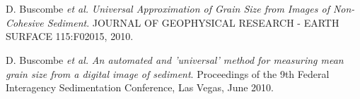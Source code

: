 \documentclass{article} %
\def\sf{\sffamily}
\def\sl{\slshape}
\newlength\sidebarwidth
\newcommand{\subtopic}[3][]
	 {\begin{minipage}{\textwidth}
	 \vspace*{.4\baselineskip}
         \nopagebreak\hspace{0in}%
         \nopagebreak\begin{minipage}[t]{\sidebarwidth - .2cm}
         \raggedleft {\sf\fontseries{sbc}\selectfont #2}
         {\\[-0.2\baselineskip] \textcolor{gray}{\footnotesize #1}}
	 \end{minipage}%
	 \hfill
	 \begin{minipage}[t]{\linewidth - \sidebarwidth}
	 #3%
	 \end{minipage}%
	 \vspace*{.2\baselineskip plus 1\baselineskip minus
	 .2\baselineskip}%
	 \end{minipage}}
\begin{document}
\subtopic{\hspace*{-3ex} 2010}{~
  \begin{itemize}[leftmargin=0ex, itemsep=0ex, parsep=.5ex, labelindent=-4ex]

    \publication
      D. Buscombe {\sl et al.}
      {\sl Universal Approximation of Grain Size from Images of Non-Cohesive Sediment}.
      JOURNAL OF GEOPHYSICAL RESEARCH - EARTH SURFACE 115:F02015, 2010.

    \publication
      D. Buscombe {\sl et al.}
      {\sl An automated and 'universal' method for measuring mean grain size from a digital image of sediment}.
      Proceedings of the 9th Federal Interagency Sedimentation Conference, Las Vegas, June 2010.

    \end{itemize}
}
\end{document}
